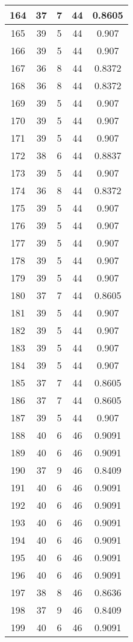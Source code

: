 \documentclass[letterpaper, 12pt]{article}
\begin{document}
\begin{longtable}{|c|c|c|c|c|}
\hline
164 & 37 & 7 & 44 & 0.8605 \\
\hline
165 & 39 & 5 & 44 & 0.907 \\
\hline
166 & 39 & 5 & 44 & 0.907 \\
\hline
167 & 36 & 8 & 44 & 0.8372 \\
\hline
168 & 36 & 8 & 44 & 0.8372 \\
\hline
169 & 39 & 5 & 44 & 0.907 \\
\hline
170 & 39 & 5 & 44 & 0.907 \\
\hline
171 & 39 & 5 & 44 & 0.907 \\
\hline
172 & 38 & 6 & 44 & 0.8837 \\
\hline
173 & 39 & 5 & 44 & 0.907 \\
\hline
174 & 36 & 8 & 44 & 0.8372 \\
\hline
175 & 39 & 5 & 44 & 0.907 \\
\hline
176 & 39 & 5 & 44 & 0.907 \\
\hline
177 & 39 & 5 & 44 & 0.907 \\
\hline
178 & 39 & 5 & 44 & 0.907 \\
\hline
179 & 39 & 5 & 44 & 0.907 \\
\hline
180 & 37 & 7 & 44 & 0.8605 \\
\hline
181 & 39 & 5 & 44 & 0.907 \\
\hline
182 & 39 & 5 & 44 & 0.907 \\
\hline
183 & 39 & 5 & 44 & 0.907 \\
\hline
184 & 39 & 5 & 44 & 0.907 \\
\hline
185 & 37 & 7 & 44 & 0.8605 \\
\hline
186 & 37 & 7 & 44 & 0.8605 \\
\hline
187 & 39 & 5 & 44 & 0.907 \\
\hline
188 & 40 & 6 & 46 & 0.9091 \\
\hline
189 & 40 & 6 & 46 & 0.9091 \\
\hline
190 & 37 & 9 & 46 & 0.8409 \\
\hline
191 & 40 & 6 & 46 & 0.9091 \\
\hline
192 & 40 & 6 & 46 & 0.9091 \\
\hline
193 & 40 & 6 & 46 & 0.9091 \\
\hline
194 & 40 & 6 & 46 & 0.9091 \\
\hline
195 & 40 & 6 & 46 & 0.9091 \\
\hline
196 & 40 & 6 & 46 & 0.9091 \\
\hline
197 & 38 & 8 & 46 & 0.8636 \\
\hline
198 & 37 & 9 & 46 & 0.8409 \\
\hline
199 & 40 & 6 & 46 & 0.9091 \\
\hline
\end{longtable}
\end{document}
